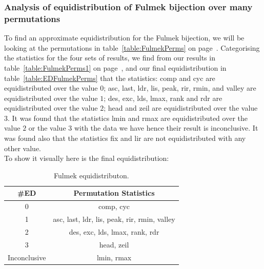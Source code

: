 \documentclass[12pt]{article}
\begin{document}
\subsubsection{Analysis of equidistribution of Fulmek bijection over many permutations}
To find an approximate equidistribution for the Fulmek bijection, we will be looking at the permutations in table~\ref{table:FulmekPerms} on page~\pageref{table:FulmekPerms}. Categorising the statistics for the four sets of results, we find from our results in table~\ref{table:FulmekPerms1} on page~\pageref{table:FulmekPerms1}, and our final equidistribution in table~\ref{table:EDFulmekPerms} that the statistics: comp and cyc are equidistributed over the value $0$; asc, last, ldr, lis, peak, rir, rmin, and valley are equidistributed over the value $1$; des, exc, lds, lmax, rank and rdr are equidistributed over the value $2$; head and zeil are equidistributed over the value $3$. It was found that the statistics lmin and rmax are equidistributed over the value $2$ or the value $3$ with the data we have hence their result is inconclusive. It was found also that the statistics fix and lir are not equidistributed with any other value.\\
To show it visually here is the final equidistribution:
\begin{table}[H]
\caption{Fulmek equidistributon.}
\begin{tabular}{c | c}
\hline\hline
\#ED & Permutation Statistics\\ [0.5ex]
\hline
0 & comp, cyc \\
\hline
1 & asc, last, ldr, lis, peak, rir, rmin, valley  \\
\hline
2 & des, exc, lds, lmax, rank, rdr \\
\hline
3 & head, zeil \\
\hline
Inconclusive & lmin, rmax \\
\hline
\end{tabular}
\label{table:FinalEDFulmek}
\end{table}
\end{document}
